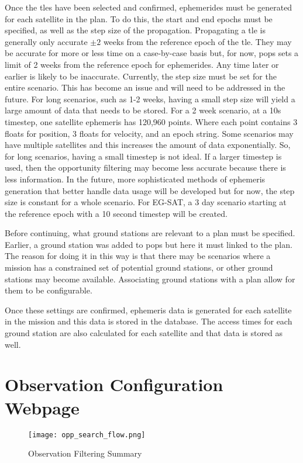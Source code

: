 Once the \glspl{tle} have been selected and confirmed, ephemerides must be
generated for each satellite in the plan. To do this, the start and end epochs
must be specified, as well as the step size of the propagation. Propagating a
\gls{tle} is generally only accurate $\pm 2$ weeks from the reference epoch of
the \gls{tle}. They may be accurate for more or less time on a case-by-case
basis but, for now, \gls{pops} sets a limit of 2 weeks from the reference epoch
for ephemerides. Any time later or earlier is likely to be inaccurate.
Currently, the step size must be set for the entire scenario. This has become
an issue and will need to be addressed in the future. For long scenarios, such
as 1-2 weeks, having a small step size will yield a large amount of data that
needs to be stored. For a 2 week scenario, at a 10s timestep, one satellite
ephemeris has 120,960 points.  Where each point contains 3 floats for position,
3 floats for velocity, and an epoch string. Some scenarios may have multiple
satellites and this increases the amount of data exponentially. So, for long
scenarios, having a small timestep is not ideal. If a larger timestep is used,
then the opportunity filtering may become less accurate because there is less
information. In the future, more sophisticated methods of ephemeris generation
that better handle data usage will be developed but for now, the step size is
constant for a whole scenario. For EG-SAT, a 3 day scenario starting at the
reference epoch with a 10 second timestep will be created. 

Before continuing, what ground stations are relevant to a plan must be
specified.  Earlier, a ground station was added to \gls{pops} but here it must
linked to the plan. The reason for doing it in this way is that there may be
scenarios where a mission has a constrained set of potential ground stations,
or other ground stations may become available. Associating ground stations with
a plan allow for them to be configurable. 

Once these settings are confirmed, ephemeris data is generated for each
satellite in the mission and this data is stored in the database. The access
times for each ground station are also calculated for each satellite and that
data is stored as well.


\section{Observation Configuration Webpage}

\begin{figure}[h]
    \centering
    \texttt{[image: opp\_search\_flow.png]} 
    \caption{Observation Filtering Summary}
    \label{fig:obs_fil} 
\end{figure}


